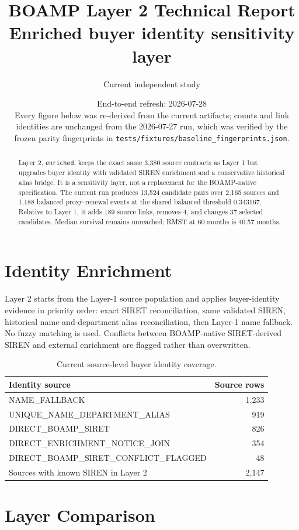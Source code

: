 \documentclass[11pt]{article}
\title{BOAMP Layer 2 Technical Report\\
\large Enriched buyer identity sensitivity layer}
\author{Current independent study}
\date{End-to-end refresh: 2026-07-28\\
\small Every figure below was re-derived from the current artifacts; counts and link
identities are unchanged from the 2026-07-27 run, which was verified by the frozen
parity fingerprints in \texttt{tests/fixtures/baseline\_fingerprints.json}.}
\begin{document}
\maketitle

\begin{abstract}
Layer 2, \texttt{enriched}, keeps the exact same 3{,}380 source contracts as
Layer 1 but upgrades buyer identity with validated SIREN enrichment and a
conservative historical alias bridge. It is a sensitivity layer, not a
replacement for the BOAMP-native specification. The current run produces
13{,}524 candidate pairs over 2{,}165 sources and 1{,}188 balanced proxy-renewal
events at the shared balanced threshold \(0.343167\). Relative to Layer 1, it
adds 189 source links, removes 4, and changes 37 selected candidates. Median
survival remains unreached; RMST at 60 months is 40.57 months.
\end{abstract}

\section{Identity Enrichment}

Layer 2 starts from the Layer-1 source population and applies buyer-identity
evidence in priority order: exact SIRET reconciliation, same validated SIREN,
historical name-and-department alias reconciliation, then Layer-1 name fallback.
No fuzzy matching is used. Conflicts between BOAMP-native SIRET-derived SIREN
and external enrichment are flagged rather than overwritten.

\begin{table}[h!]
\centering
\caption{Current source-level buyer identity coverage.}
\begin{tabular}{lr}
\toprule
Identity source & Source rows \\
\midrule
NAME\_FALLBACK & 1{,}233 \\
UNIQUE\_NAME\_DEPARTMENT\_ALIAS & 919 \\
DIRECT\_BOAMP\_SIRET & 826 \\
DIRECT\_ENRICHMENT\_NOTICE\_JOIN & 354 \\
DIRECT\_BOAMP\_SIRET\_CONFLICT\_FLAGGED & 48 \\
\midrule
Sources with known SIREN in Layer 2 & 2{,}147 \\
\bottomrule
\end{tabular}
\end{table}

\section{Layer Comparison}
\end{document}
